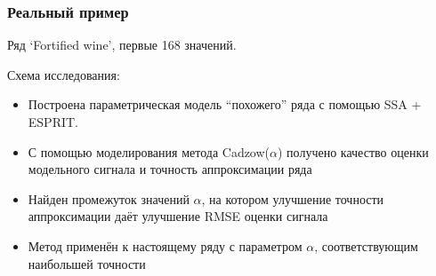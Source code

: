 \documentclass[unicode, notheorems]{beamer}
\begin{document}
\begin{frame}
	\frametitle{Реальный пример}
    Ряд `Fortified wine', первые 168 значений.
    
    Схема исследования:
    \begin{itemize}
    	\item Построена параметрическая модель ``похожего'' ряда с помощью SSA + ESPRIT.
    	\item С помощью моделирования метода Cadzow($\alpha$) получено качество оценки модельного сигнала и точность аппроксимации ряда
    	\item Найден промежуток значений $\alpha$, на котором улучшение точности аппроксимации даёт улучшение RMSE оценки сигнала
    	\item Метод применён к настоящему ряду с параметром $\alpha$, соответствующим наибольшей точности
    \end{itemize}
\end{frame}

%	
\end{document}
